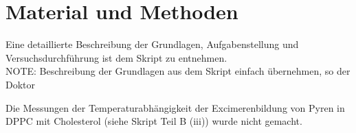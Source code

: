 \section{Material und Methoden}
Eine detaillierte Beschreibung der Grundlagen, Aufgabenstellung und Versuchsdurchführung ist dem Skript \cite{Kursskript} zu entnehmen. \\

NOTE: Beschreibung der Grundlagen aus dem Skript einfach übernehmen, so der Doktor

Die Messungen der Temperaturabhängigkeit der Excimerenbildung von Pyren in DPPC mit Cholesterol (siehe Skript Teil B (iii)) wurde nicht gemacht.


\newpage